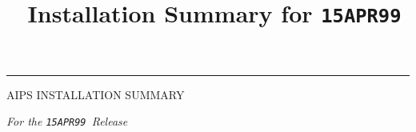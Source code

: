 

\def\example#1{\line{\hskip 1.2cm \tt #1\hfill}}
\def\exxample#1{\line{{\tt #1}\hfill}}


\let\contents=\iftrue


\twelvepoint


\def\THISVER{{\tt 15APR99}}   %


\title{\aips\ Installation Summary for \THISVER}
\def\BOH{\aips\ {\it Unix Porting Reference\/}} %
\def\AIPPGM{{\tt\$AIPPGM}}
\def\AIPSUB{{\tt\$AIPSUB}}
\def\ALT2{{\tt\$ALT2}}
\def\APGNOT{{\tt\$APGNOT}}
\def\APLGEN{{\tt\$APLGEN}}
\def\APLLINUX{{\tt\$APLLINUX}}
\def\APLPGM{{\tt\$APLPGM}}
\def\APLSOL{{\tt\$APLSOL}}
\def\APLSUB{{\tt\$APLSUB}}
\def\ARCH{{\tt\$ARCH}}
\def\AROOT{{\tt\$AIPS\_ROOT}}
\def\AVERS{{\tt\$AIPS\_VERSION}}
\def\CDTST{{\tt\$CDTST}}
\def\DA00{{\tt\$DA00}}
\def\DATAROOT{{\tt\$DATA\_ROOT}}
\def\HLPFIL{{\tt\$HLPFIL}}
\def\HOME{{\tt\$HOME}}
\def\HOST{{\tt\$HOST}}
\def\LDLIB{{\tt\$LD\_LIBRARY\_PATH}}
\def\LIBR{{\tt\$LIBR}}
\def\LOAD{{\tt\$LOAD}}
\def\NET0{{\tt\$NET0}}
\def\SITE{{\tt\$SITE}}
\def\SYSIBM{{\tt\$SYSIBM}}
\def\SYSLINUX{{\tt\$SYSLINUX}}
\def\SYSL{{\tt\$SYSLOCAL}}
\def\SYSU{{\tt\$SYSUNIX}}
\def\YSERV{{\tt\$YSERV}}

\def\ret{$\downarrow$}
\def\APEIN#1{\example{\$~{#1}\ret}}
\def\ttaips{{\tt AIPS}}
%
%
 \hrule \vskip 2cm

\centerline{\nraofont AIPS INSTALLATION SUMMARY} \bigskip

\centerline{\sl For the \THISVER\ Release} \bigskip

